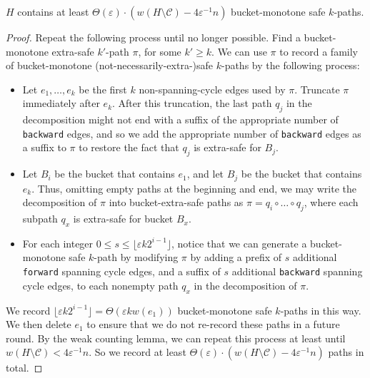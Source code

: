 \documentclass{article}\usepackage[a4paper,margin=20mm]{geometry}
\newcommand{\eps}{\varepsilon}
\newcommand{\cee}{\mathcal{C}}
\newcommand{\forward}{\texttt{forward}}
\newcommand{\backward}{\texttt{backward}}
\begin{document}
\begin{lemma} 
$H$ contains at least $\Theta(\eps) \cdot \left( w(H \setminus \cee) - 4 \eps^{-1} n \right)$ bucket-monotone safe $k$-paths.
\end{lemma}
\begin{proof}
Repeat the following process until no longer possible.
Find a bucket-monotone extra-safe $k'$-path $\pi$, for some $k' \ge k$.
We can use $\pi$ to record a family of bucket-monotone (not-necessarily-extra-)safe $k$-paths by the following process:
\begin{itemize}
\item Let $e_1, \dots, e_k$ be the first $k$ non-spanning-cycle edges used by $\pi$.
Truncate $\pi$ immediately after $e_k$.
After this truncation, the last path $q_j$ in the decomposition might not end with a suffix of the appropriate number of \backward{} edges, and so we add the appropriate number of \backward{} edges as a suffix to $\pi$ to restore the fact that $q_j$ is extra-safe for $B_j$.

\item Let $B_i$ be the bucket that contains $e_1$, and let $B_j$ be the bucket that contains $e_k$.
Thus, omitting empty paths at the beginning and end, we may write the decomposition of $\pi$ into bucket-extra-safe paths as $\pi = q_i \circ \dots \circ q_j$, where each subpath $q_x$ is extra-safe for bucket $B_x$.

\item For each integer $0 \le s \le \lfloor \eps k 2^{i-1} \rfloor$, notice that we can generate a bucket-monotone safe $k$-path by modifying $\pi$ by adding a prefix of $s$ additional \forward{} spanning cycle edges, and a suffix of $s$ additional \backward{} spanning cycle edges, to each nonempty path $q_x$ in the decomposition of $\pi$.
\end{itemize}

We record $\lfloor \eps k 2^{i-1} \rfloor = \Theta(\eps k w(e_1))$ bucket-monotone safe $k$-paths in this way.
We then delete $e_1$ to ensure that we do not re-record these paths in a future round.
By the weak counting lemma, we can repeat this process at least until $w(H \setminus \cee) < 4 \eps^{-1} n$.
So we record at least $\Theta(\eps) \cdot (w(H \setminus \cee) - 4 \eps^{-1} n)$ paths in total.
\end{proof}
\end{document}

